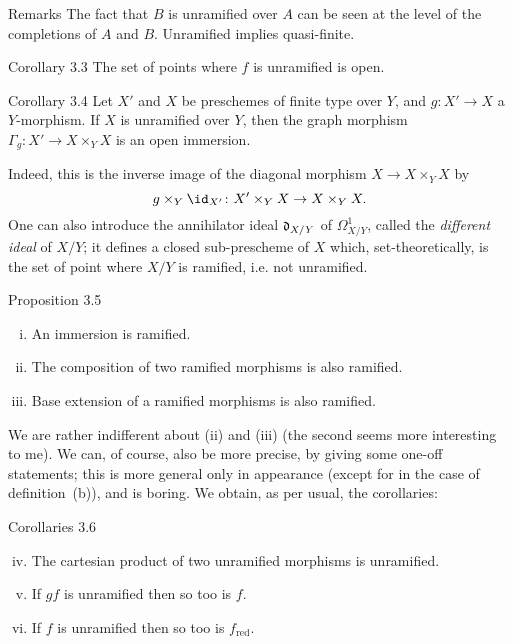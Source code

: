 \begin{rmenv}{Remarks}
    The fact that $B$ is unramified over $A$ can be seen at the level of the completions of $A$ and $B$.
    Unramified implies quasi-finite.
\end{rmenv}

\begin{itenv}{Corollary 3.3}
    The set of points where $f$ is unramified is open.
\end{itenv}

\begin{itenv}{Corollary 3.4}
    Let $X'$ and $X$ be preschemes of finite type over $Y$, and $g\colon X'\to X$ a $Y$-morphism.
    If $X$ is unramified over $Y$, then the graph morphism $\Gamma_g\colon X'\to X\times_Y X$ is an open immersion.
\end{itenv}

Indeed, this is the inverse image of the diagonal morphism $X\to X\times_Y X$ by
\[
  g\times_Y \id_{X'}\colon X'\times_Y X\to X\times_Y X.
\]
One can also introduce the annihilator ideal $\frak{d}_{X/Y}$ of $\Omega_{X/Y}^1$, called the \emph{different ideal} of $X/Y$;
it defines a closed sub-prescheme of $X$ which, set-theoretically, is the set of point where $X/Y$ is ramified, i.e. not unramified.

\begin{itenv}{Proposition 3.5}
  \begin{enumerate}[(i)]
    \item An immersion is ramified.
    \item The composition of two ramified morphisms is also ramified.
    \item Base extension of a ramified morphisms is also ramified.
  \end{enumerate}
\end{itenv}

We are rather indifferent about (ii) and (iii) (the second seems more interesting to me).
We can, of course, also be more precise, by giving some one-off statements;
this is more general only in appearance (except for in the case of definition~(b)), and is boring.
We obtain, as per usual, the corollaries:

\begin{itenv}{Corollaries 3.6}
  \begin{enumerate}[(i)]
    \setcounter{enumi}{3}
    \item The cartesian product of two unramified morphisms is unramified.
    \item If $gf$ is unramified then so too is $f$.
    \item If $f$ is unramified then so too is $f_\text{red}$.
  \end{enumerate}
\end{itenv}

